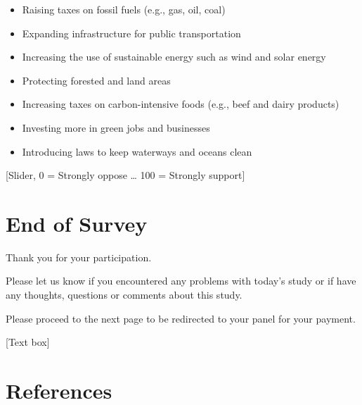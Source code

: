\documentclass[
  letterpaper,
  DIV=11,
  numbers=noendperiod]{scrartcl}
\providecommand{\tightlist}{%
  \setlength{\itemsep}{0pt}\setlength{\parskip}{0pt}}
\begin{document}
\begin{itemize}
\tightlist
\item
  Raising taxes on fossil fuels (e.g., gas, oil, coal)
\item
  Expanding infrastructure for public transportation
\item
  Increasing the use of sustainable energy such as wind and solar energy
\item
  Protecting forested and land areas
\item
  Increasing taxes on carbon-intensive foods (e.g., beef and dairy
  products)
\item
  Investing more in green jobs and businesses
\item
  Introducing laws to keep waterways and oceans clean
\end{itemize}

{[}Slider, 0 = Strongly oppose \ldots{} 100 = Strongly support{]}

\section{End of Survey}\label{end-of-survey}

Thank you for your participation.

Please let us know if you encountered any problems with today's study or
if have any thoughts, questions or comments about this study.

Please proceed to the next page to be redirected to your panel for your
payment.

{[}Text box{]}

\section*{References}\label{references}
\end{document}
